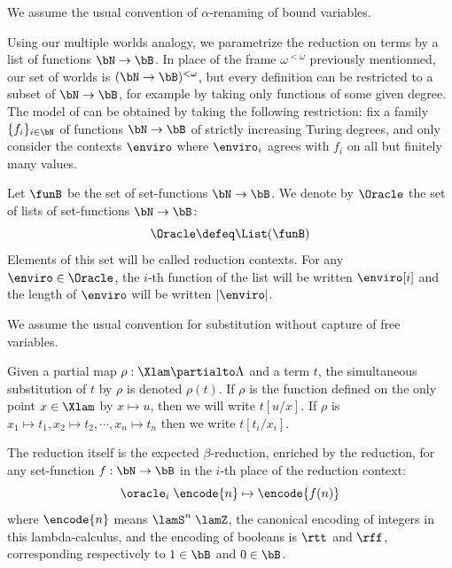 We assume the usual convention of $\alpha$-renaming of bound variables.

Using our multiple worlds analogy, we parametrize the reduction on terms by a list of functions $\bN \to \bB$. In place of the frame $\omega^{<\omega}$ previously mentionned, our set of worlds is $(\bN \to \bB)^{<\omega}$, but every definition can be restricted to a subset of $\bN \to \bB$, for example by taking only functions of some given degree. The model of \cite{LubRat13}
can be obtained by taking the following restriction: fix a family $\{f_i\}_{i \in \bN}$ of functions $\bN \to \bB$ of strictly increasing Turing degrees, and only consider the contexts $\enviro$ where $\enviro_i$ agrees with $f_i$ on all but finitely many values.

\begin{definition}
  Let $\funB$ be the set of set-functions $\bN \to \bB$. We denote by $\Oracle$ the set of lists of set-functions $\bN \to \bB$:
  \[\Oracle \defeq \List(\funB)\]
  Elements of this set will be called reduction contexts. For any $\enviro \in \Oracle$, the $i$-th function of the list will be written $\enviro[i]$ and the length of $\enviro$ will be written $|\enviro|$.
\end{definition}

We assume the usual convention for substitution without capture of free variables.

\begin{notation}
  Given a partial map $\rho : \Xlam \partialto \Lambda$ and a term $t$, the simultaneous substitution of $t$ by $\rho$ is denoted $\rho(t)$. If $\rho$ is the function defined on the only point $x \in \Xlam$ by $x \mapsto u$, then we will write $t[u/x]$. If $\rho$ is $x_1 \mapsto t_1, x_2 \mapsto t_2, \cdots, x_n \mapsto t_n$ then we write $t[t_i/x_i]$.
\end{notation}

The reduction itself is the expected $\beta$-reduction, enriched by the reduction, for
any set-function $f : \bN \to \bB$ in the $i$-th place of the reduction context:
\[\oracle_i \;\encode{n} \mapsto \encode{f(n)}\]
where $\encode{n}$ means $\lamS^n\;\lamZ$, the canonical encoding of integers in this lambda-calculus, and the encoding of booleans is $\rtt$ and $\rff$, corresponding respectively to $1 \in \bB$ and $0 \in \bB$.

